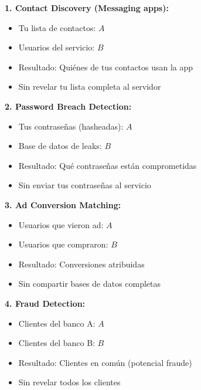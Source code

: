 \documentclass[11pt,a4paper,twoside]{book}
\theoremstyle{definition}
\theoremstyle{remark}
\begin{document}
\begin{mathnote}
\textbf{1. Contact Discovery (Messaging apps):}
\begin{itemize}
    \item Tu lista de contactos: $A$
    \item Usuarios del servicio: $B$
    \item Resultado: Quiénes de tus contactos usan la app
    \item Sin revelar tu lista completa al servidor
\end{itemize}

\textbf{2. Password Breach Detection:}
\begin{itemize}
    \item Tus contraseñas (hasheadas): $A$
    \item Base de datos de leaks: $B$
    \item Resultado: Qué contraseñas están comprometidas
    \item Sin enviar tus contraseñas al servicio
\end{itemize}

\textbf{3. Ad Conversion Matching:}
\begin{itemize}
    \item Usuarios que vieron ad: $A$
    \item Usuarios que compraron: $B$
    \item Resultado: Conversiones atribuidas
    \item Sin compartir bases de datos completas
\end{itemize}

\textbf{4. Fraud Detection:}
\begin{itemize}
    \item Clientes del banco A: $A$
    \item Clientes del banco B: $B$
    \item Resultado: Clientes en común (potencial fraude)
    \item Sin revelar todos los clientes
\end{itemize}
\end{mathnote}
\end{document}
